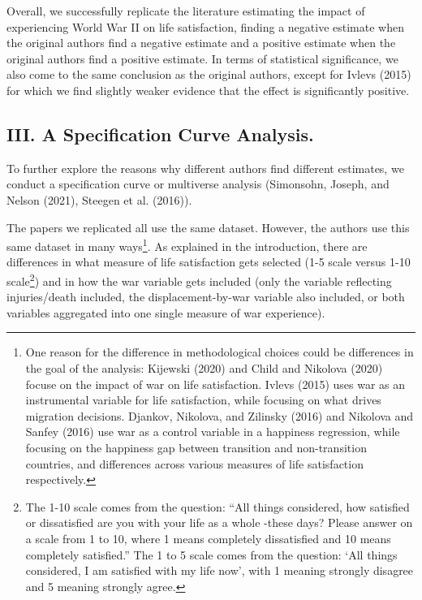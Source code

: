 \documentclass[
  letterpaper,
  DIV=11,
  numbers=noendperiod]{scrartcl}
\begin{document}
Overall, we successfully replicate the literature estimating the impact
of experiencing World War II on life satisfaction, finding a negative
estimate when the original authors find a negative estimate and a
positive estimate when the original authors find a positive estimate. In
terms of statistical significance, we also come to the same conclusion
as the original authors, except for Ivlevs (2015) for which we find
slightly weaker evidence that the effect is significantly positive.

\hypertarget{iii.-a-specification-curve-analysis.}{%
\subsection{III. A Specification Curve
Analysis.}\label{iii.-a-specification-curve-analysis.}}

To further explore the reasons why different authors find different
estimates, we conduct a specification curve or multiverse analysis
(Simonsohn, Joseph, and Nelson (2021), Steegen et al. (2016)).

The papers we replicated all use the same dataset. However, the authors
use this same dataset in many ways\footnote{One reason for the
  difference in methodological choices could be differences in the goal
  of the analysis: Kijewski (2020) and Child and Nikolova (2020) focuse
  on the impact of war on life satisfaction. Ivlevs (2015) uses war as
  an instrumental variable for life satisfaction, while focusing on what
  drives migration decisions. Djankov, Nikolova, and Zilinsky (2016) and
  Nikolova and Sanfey (2016) use war as a control variable in a
  happiness regression, while focusing on the happiness gap between
  transition and non-transition countries, and differences across
  various measures of life satisfaction respectively.}. As explained in
the introduction, there are differences in what measure of life
satisfaction gets selected (1-5 scale versus 1-10 scale\footnote{The
  1-10 scale comes from the question: ``All things considered, how
  satisfied or dissatisfied are you with your life as a whole -these
  days? Please answer on a scale from 1 to 10, where 1 means completely
  dissatisfied and 10 means completely satisfied.'' The 1 to 5 scale
  comes from the question: `All things considered, I am satisfied with
  my life now', with 1 meaning strongly disagree and 5 meaning strongly
  agree.}) and in how the war variable gets included (only the variable
reflecting injuries/death included, the displacement-by-war variable
also included, or both variables aggregated into one single measure of
war experience).
\end{document}
